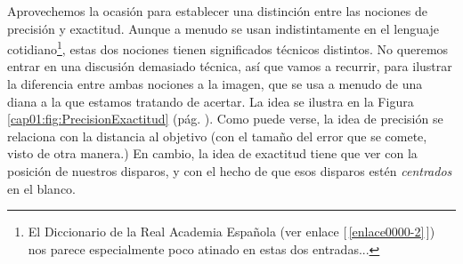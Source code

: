 Aprovechemos la ocasión para establecer una distinción entre las nociones de precisión y exactitud. Aunque a menudo se usan indistintamente en el
lenguaje cotidiano\footnote{El Diccionario de la Real Academia Española (ver enlace [\,\ref{enlace0000-2}\,]\label{enlace0000a-2}) nos
parece especialmente poco atinado en estas dos entradas...}, estas dos nociones tienen significados técnicos distintos. No queremos entrar en una
discusión demasiado técnica, así que vamos a recurrir, para ilustrar la diferencia entre ambas nociones a la imagen, que se usa a menudo de una diana
a la que estamos tratando de acertar. La idea se ilustra en la Figura \ref{cap01:fig:PrecisionExactitud} (pág.
\pageref{cap01:fig:PrecisionExactitud}). Como puede verse, la idea de precisión se
relaciona con la distancia al objetivo (con el tamaño del error que se comete, visto de otra manera.)  En cambio, la idea de exactitud tiene que ver
con la posición de nuestros disparos, y con el hecho de que esos disparos estén {\em centrados} en el blanco.
